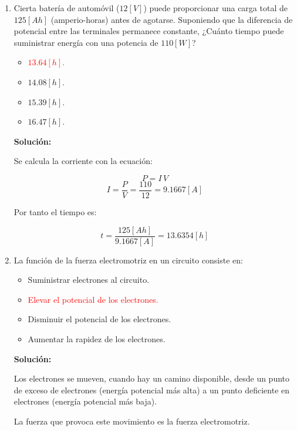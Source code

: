 \documentclass[letter,11pt]{article}
\begin{document}
\begin{enumerate}
\item Cierta batería de automóvil ($12 [V]$) puede proporcionar una carga total
de $125 [Ah]$ (amperio-horas) antes de agotarse. Suponiendo que la diferencia de
potencial entre las terminales permanece constante, ¿Cuánto tiempo puede
suministrar energía con una potencia de $110 [W]$?

\begin{itemize}
    \item \textcolor{red}{$13.64 [h]$.}
    \item $14.08 [h]$.
    \item $15.39 [h]$.
    \item $16.47 [h]$.
\end{itemize}

\textbf{Solución:}

Se calcula la corriente con la ecuación:

\begin{equation*}
    P = I\,V
\end{equation*}
\begin{equation*}
    I = \frac{P}{V} = \frac{110}{12} = 9.1667 [A]
\end{equation*}

Por tanto el tiempo es:

\begin{equation*}
    t = \frac{125 [Ah]}{9.1667 [A]} = 13.6354 [h]
\end{equation*}

\item La función de la fuerza electromotriz en un circuito consiste en:

\begin{itemize}
    \item Suministrar electrones al circuito.
    \item \textcolor{red}{Elevar el potencial de los electrones.}
    \item Disminuir el potencial de los electrones.
    \item Aumentar la rapidez de los electrones.
\end{itemize}

\textbf{Solución:}

Los electrones se mueven, cuando hay un camino disponible, desde un punto de
exceso de electrones (energía potencial más alta) a un punto deficiente en
electrones (energía potencial más baja).

La fuerza que provoca este movimiento es la fuerza electromotriz.


\end{enumerate}
\end{document}
